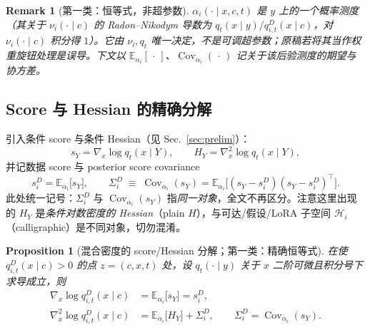 \documentclass[11pt,a4paper]{article}
\newtheorem{proposition}[theorem]{Proposition}
\newtheorem{remark}[theorem]{Remark}
\DeclareMathOperator{\Cov}{Cov}
\newcommand{\E}{\mathbb{E}}
\newcommand{\cH}{\mathcal{H}}   %
\begin{document}
\begin{remark}[第一类：恒等式，非超参数]\label{rem:s3:alpha-exact}
$\alpha_i(\cdot\mid x,c,t)$ 是 $y$ 上的一个概率测度（其关于 $\nu_i(\cdot\mid c)$ 的 Radon--Nikodym 导数为 $q_t(x\mid y)/q_{i,t}^{D}(x\mid c)$，对 $\nu_i(\cdot\mid c)$ 积分得 $1$）。它由 $\nu_i,q_t$ 唯一决定，\emph{不是}可调超参数；原稿若将其当作权重旋钮处理是误导。下文以 $\E_{\alpha_i}[\,\cdot\,]$、$\Cov_{\alpha_i}(\,\cdot\,)$ 记关于该后验测度的期望与协方差。
\end{remark}

\subsection{Score 与 Hessian 的精确分解}\label{subsec:s3:hess}

引入条件 score 与条件 Hessian（见 Sec.~\ref{sec:prelim}）：
\begin{equation}\label{eq:s3:sy-Hy}
s_Y=\nabla_x\log q_t(x\mid Y),\qquad H_Y=\nabla_x^2\log q_t(x\mid Y),
\end{equation}
并记数据 score 与 posterior score covariance
\begin{equation}\label{eq:s3:sD-SigmaD}
s_i^{D}=\E_{\alpha_i}\!\big[s_Y\big],\qquad
\Sigma_i^{D}\;\equiv\;\Cov_{\alpha_i}(s_Y)=\E_{\alpha_i}\!\big[(s_Y-s_i^{D})(s_Y-s_i^{D})^\top\big].
\end{equation}
此处统一记号：$\Sigma_i^{D}$ 与 $\Cov_{\alpha_i}(s_Y)$ 指\emph{同一对象}，全文不再区分。注意这里出现的 $H_Y$ 是\emph{条件对数密度的 Hessian}（plain $H$），与可达/假设/LoRA 子空间 $\cH_i$（calligraphic）是不同对象，切勿混淆。

\begin{proposition}[混合密度的 score/Hessian 分解；第一类：精确恒等式]\label{prop:s3:decomp}
在使 $q_{i,t}^{D}(x\mid c)>0$ 的点 $z=(c,x,t)$ 处，设 $q_t(\cdot\mid y)$ 关于 $x$ 二阶可微且积分号下求导成立，则
\begin{align}
\nabla_x\log q_{i,t}^{D}(x\mid c)&=\E_{\alpha_i}\!\big[s_Y\big]=s_i^{D},\label{eq:s3:score-id}\\[2pt]
\nabla_x^2\log q_{i,t}^{D}(x\mid c)&=\E_{\alpha_i}\!\big[H_Y\big]+\Sigma_i^{D},
\qquad \Sigma_i^{D}=\Cov_{\alpha_i}(s_Y).\label{eq:s3:hess-id}
\end{align}
\end{proposition}
\end{document}
